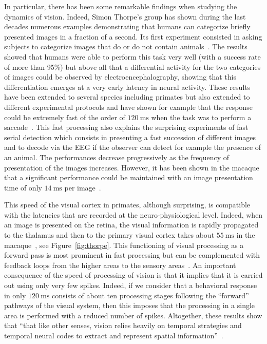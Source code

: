 \documentclass[brainsci, %
               review,submit,pdftex,moreauthors%
               ]{Definitions/mdpi}
\newcommand{\ms}{\si{\milli\second}}%
\begin{document}
In particular, there has been some remarkable findings when studying the dynamics of vision. Indeed, Simon Thorpe's group has shown during the last decades numerous examples demonstrating that humans can categorize briefly presented images in a fraction of a second. Its first experiment consisted in asking subjects to categorize images that do or do not contain animals~\citep{thorpe_speed_1996}. The results showed that humans were able to perform this task very well (with a success rate of more than 95\%) but above all that a differential activity for the two categories of images could be observed by electroencephalography, showing that this differentiation emerges at a very early latency in neural activity. These results have been extended to several species including primates but also extended to different experimental protocols and have shown for example that the response could be extremely fast of the order of $120~\ms$ when the task was to perform a saccade~\citep{kirchner_ultra-rapid_2006}. This fast processing also explains the surprising experiments of fast serial detection which consists in presenting a fast succession of different images and to decode via the EEG if the observer can detect for example the presence of an animal. The performances decrease progressively as the frequency of presentation of the images increases. However, it has been shown in the macaque that a significant performance could be maintained with an image presentation time of only $14~\ms$ per image~\citep{keysers_speed_2001}.

This speed of the visual cortex in primates, although surprising, is  compatible with the latencies that are recorded at the neuro-physiological level. Indeed, when an image is presented on the retina, the visual information is rapidly propagated to the thalamus and then to the primary visual cortex takes about $55~\ms$ in the macaque~\citep{nowak_timing_1997}, see Figure~\ref{fig:thorpe}. This functioning of visual processing as a forward pass is most prominent in fast processing but can be complemented with feedback loops from the higher areas to the sensory areas~\citep{lamme_distinct_2000}.
%
An important consequence of the speed of processing of vision is that it implies that it is carried out using only very few spikes. Indeed, if we consider that a behavioral response in only $120~\ms$ consists of about ten processing stages following the ``forward'' pathways of the visual system, then this imposes that the processing in a single area is performed with a reduced number of spikes. Altogether, these results show that ``that like other senses, vision relies heavily on temporal strategies and temporal neural codes to extract and represent spatial information''~\citep{rucci_temporal_2018}.
\end{document}
